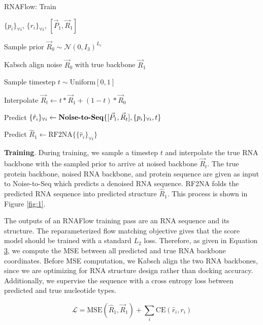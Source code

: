 \begin{algorithm}[t]
\caption{RNAFlow: Train}\label{rnaflow:train}

\algorithmicrequire $\{p_i\}_{\forall i}$, $\{r_i\}_{\forall i}$, $[\vec P_1, \vec R_1]$
\vspace{0.25em}

Sample prior $\vec R_0 \sim \mathcal{N}(0, I_3)^{L_r}$
\vspace{0.25em}

Kabsch align noise $\vec R_0$ with true backbone $\vec R_1$
\vspace{0.25em}

Sample timestep $t \sim \text{Uniform}[0, 1]$
\vspace{0.25em}

Interpolate $\vec R_t \gets t * \vec R_1 + (1 - t) * \vec R_0$
\vspace{0.25em}

Predict $\{\hat r_i\}_{\forall i} \gets \text{\textbf{Noise-to-Seq}} \{ [\vec P_1, \vec R_t], \{p_i\}_{\forall i}, t \}$ 
\vspace{0.25em}

Predict $\hat R_1 \gets \text{RF2NA} \{ \{\hat r_i\}_{\forall i} \} $

\end{algorithm}

\textbf{Training}. During training, we sample a timestep $t$ and interpolate the true RNA backbone with the sampled prior to arrive at noised backbone $\vec R_t$. The true protein backbone, noised RNA backbone, and protein sequence are given as input to Noise-to-Seq which predicts a denoised RNA sequence. RF2NA folds the predicted RNA sequence into predicted structure $\hat R_1$. This process is shown in Figure \ref{fig:1}.

The outputs of an RNAFlow training pass are an RNA sequence and its structure. The reparameterized flow matching objective gives that the score model should be trained with a standard $L_2$ loss. Therefore, as given in Equation \hyperref[loss]{3}, we compute the MSE between all predicted and true RNA backbone coordinates. Before MSE computation, we Kabsch align the two RNA backbones, since we are optimizing for RNA structure design rather than docking accuracy. Additionally, we supervise the sequence with a cross entropy loss between predicted and true nucleotide types.

\begin{equation}\label{loss}
\mathcal{L} = \text{MSE}(\hat R_1, \vec R_1) + \sum_i \text{CE}(\hat r_i, r_i)
\end{equation}

